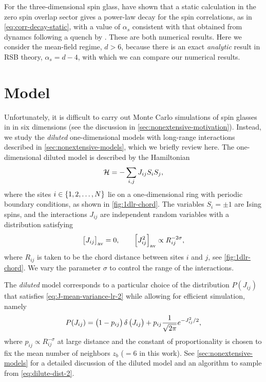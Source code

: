For the three-dimensional spin glass, \textcite{banos2010nature,banos2010static}
have shown that a static calculation in the zero spin overlap sector
gives a power-law decay for the spin correlations, as in
\cref{eq:corr-decay-static}, with a value of $\alpha_s$ consistent with that
obtained from dynamcs following a quench by \textcite{belletti2009depth}. These
are both numerical results. Here we consider the mean-field regime, $d>6$,
because there is an exact \emph{analytic} result in RSB theory, $\alpha_s=d-4$,
with which we can compare our numerical results.


\section{Model}

Unfortunately, it is difficult to carry out Monte Carlo simulations of spin
glasses in in six dimensions (see the discussion in
\cref{sec:nonextensive-motivation}). Instead, we study the \emph{diluted}
one-dimensional models with long-range interactions described in
\cref{sec:nonextensive-models}, which we briefly review here. The
one-dimensional diluted model is described by the Hamiltonian
\begin{equation}
  \mathcal{H} = -\sum_{i,j} J_{ij} S_i S_j,
\end{equation}
where the sites $i\in\cbr{1,2,\dots,N}$ lie on a one-dimensional ring with
periodic boundary conditions, as shown in \cref{fig:1dlr-chord}. The variables
$S_i = \pm 1$ are Ising spins, and the interactions $J_{ij}$ are independent
random variables with a distribution satisfying
\begin{equation}
  \left[J_{ij}\right]_{\mathrm{av}}=0,\qquad
  \left[J_{ij}^2\right]_{\mathrm{av}} \propto R_{ij}^{-2\sigma},
  \label{eq:J-mean-variance-lr-2}
\end{equation}
where $R_{ij}$ is taken to be the chord distance between sites $i$ and $j$, see
\cref{fig:1dlr-chord}. We vary the parameter $\sigma$ to control the range of
the interactions.

The \emph{diluted} model corresponds to a particular choice of the distribution
$P(J_{ij})$ that satisfies \cref{eq:J-mean-variance-lr-2} while allowing for
efficient simulation, namely
\begin{equation}
  P(J_{ij})
  = \left(1 - p_{ij}\right) \delta \left(J_{ij}\right)
  + p_{ij} \frac{1}{\sqrt{2\pi}} e^{-J_{ij}^2/2},
  \label{eq:dilute-dist-2}
\end{equation}
where $p_{ij} \propto R_{ij}^{-\sigma}$ at large distance and the constant of
proportionality is chosen to fix the mean number of neighbors $z_b$ ($=6$ in
this work). See \cref{sec:nonextensive-models} for a detailed discussion of the
diluted model and an algorithm to sample from \cref{eq:dilute-dist-2}.

